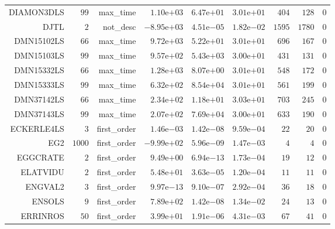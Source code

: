 \begin{longtable}{rrrrrrrrr}
DIAMON3DLS & \(    99\) & max\_time & \( 1.10\)e\(+03\) & \( 6.47\)e\(+01\) & \( 3.01\)e\(+01\) & \(   404\) & \(   128\) & \(     0\) \\
DJTL & \(     2\) & not\_desc & \(-8.95\)e\(+03\) & \( 4.51\)e\(-05\) & \( 1.82\)e\(-02\) & \(  1595\) & \(  1780\) & \(     0\) \\
DMN15102LS & \(    66\) & max\_time & \( 9.72\)e\(+03\) & \( 5.22\)e\(+01\) & \( 3.01\)e\(+01\) & \(   696\) & \(   167\) & \(     0\) \\
DMN15103LS & \(    99\) & max\_time & \( 9.57\)e\(+02\) & \( 5.43\)e\(+03\) & \( 3.00\)e\(+01\) & \(   431\) & \(   131\) & \(     0\) \\
DMN15332LS & \(    66\) & max\_time & \( 1.28\)e\(+03\) & \( 8.07\)e\(+00\) & \( 3.01\)e\(+01\) & \(   548\) & \(   172\) & \(     0\) \\
DMN15333LS & \(    99\) & max\_time & \( 6.32\)e\(+02\) & \( 8.54\)e\(+04\) & \( 3.01\)e\(+01\) & \(   561\) & \(   199\) & \(     0\) \\
DMN37142LS & \(    66\) & max\_time & \( 2.34\)e\(+02\) & \( 1.18\)e\(+01\) & \( 3.03\)e\(+01\) & \(   703\) & \(   245\) & \(     0\) \\
DMN37143LS & \(    99\) & max\_time & \( 2.07\)e\(+02\) & \( 7.69\)e\(+04\) & \( 3.00\)e\(+01\) & \(   633\) & \(   190\) & \(     0\) \\
ECKERLE4LS & \(     3\) & first\_order & \( 1.46\)e\(-03\) & \( 1.42\)e\(-08\) & \( 9.59\)e\(-04\) & \(    22\) & \(    20\) & \(     0\) \\
EG2 & \(  1000\) & first\_order & \(-9.99\)e\(+02\) & \( 5.96\)e\(-09\) & \( 1.47\)e\(-03\) & \(     4\) & \(     4\) & \(     0\) \\
EGGCRATE & \(     2\) & first\_order & \( 9.49\)e\(+00\) & \( 6.94\)e\(-13\) & \( 1.73\)e\(-04\) & \(    19\) & \(    12\) & \(     0\) \\
ELATVIDU & \(     2\) & first\_order & \( 5.48\)e\(+01\) & \( 3.63\)e\(-05\) & \( 1.20\)e\(-04\) & \(    11\) & \(    11\) & \(     0\) \\
ENGVAL2 & \(     3\) & first\_order & \( 9.97\)e\(-13\) & \( 9.10\)e\(-07\) & \( 2.92\)e\(-04\) & \(    36\) & \(    18\) & \(     0\) \\
ENSOLS & \(     9\) & first\_order & \( 7.89\)e\(+02\) & \( 1.42\)e\(-08\) & \( 1.34\)e\(-02\) & \(    24\) & \(    13\) & \(     0\) \\
ERRINROS & \(    50\) & first\_order & \( 3.99\)e\(+01\) & \( 1.91\)e\(-06\) & \( 4.31\)e\(-03\) & \(    67\) & \(    41\) & \(     0\) \\

\end{longtable}
